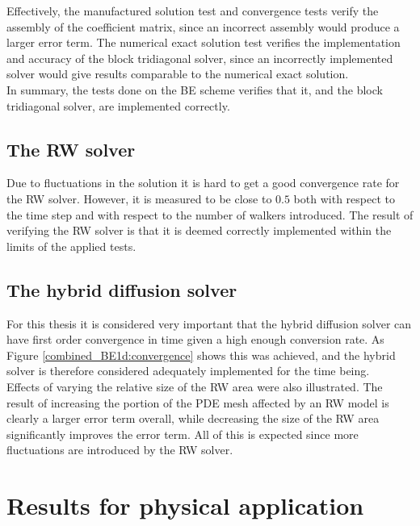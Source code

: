 \noindent Effectively, the manufactured solution test and convergence tests verify the assembly of the coefficient matrix, since an incorrect assembly would produce a larger error term. 
The numerical exact solution test verifies the implementation and accuracy of the block tridiagonal solver, since an incorrectly implemented solver would give results comparable to the numerical exact solution. \\

\noindent In summary, the tests done on the BE scheme verifies that it, and the block tridiagonal solver, are implemented correctly.

\subsection{The RW solver}
Due to fluctuations in the solution it is hard to get a good convergence rate for the RW solver. 
However, it is measured to be close to $0.5$ both with respect to the time step and with respect to the number of walkers introduced. 
The result of verifying the RW solver is that it is deemed correctly implemented within the limits of the applied tests.

\subsection{The hybrid diffusion solver}
For this thesis it is considered very important that the hybrid diffusion solver can have first order convergence in time given a high enough conversion rate. 
As Figure \ref{combined_BE1d:convergence} shows this was achieved, and the hybrid solver is therefore considered adequately implemented for the time being.\\

Effects of varying the relative size of the RW area were also illustrated. 
The result of increasing the portion of the PDE mesh affected by an RW model is clearly a larger error term overall, while decreasing the size of the RW area significantly improves the error term. 
All of this is expected since more fluctuations are introduced by the RW solver.

\section{Results for physical application}

